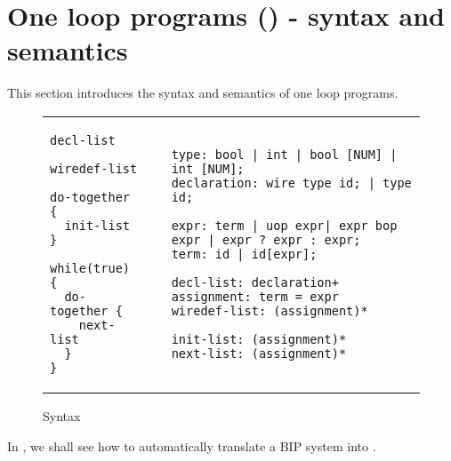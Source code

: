 \section{One loop programs (\caig) - syntax and semantics}
\label{sec:this}
%
%
This section introduces the syntax and semantics of one loop programs.
%




\begin{figure*}
\begin{tabular}{p{3cm}p{0.2cm}p{10cm}}
\begin{lstlisting}
decl-list

wiredef-list

do-together {
  init-list 
}

while(true) {
  do-together {
    next-list
  } 
}
\end{lstlisting}
&
&
\begin{lstlisting}
type: bool | int | bool [NUM] | int [NUM]; 
declaration: wire type id; | type id;

expr: term | uop expr| expr bop expr | expr ? expr : expr;
term: id | id[expr]; 

decl-list: declaration+
assignment: term = expr
wiredef-list: (assignment)*

init-list: (assignment)* 
next-list: (assignment)* 
\end{lstlisting}
\end{tabular}
\vspace{-2em}
\caption{\caig Syntax}
\label{fig:gr}
\end{figure*}
%

%
In , we shall see how to automatically translate a BIP system into \caig.
